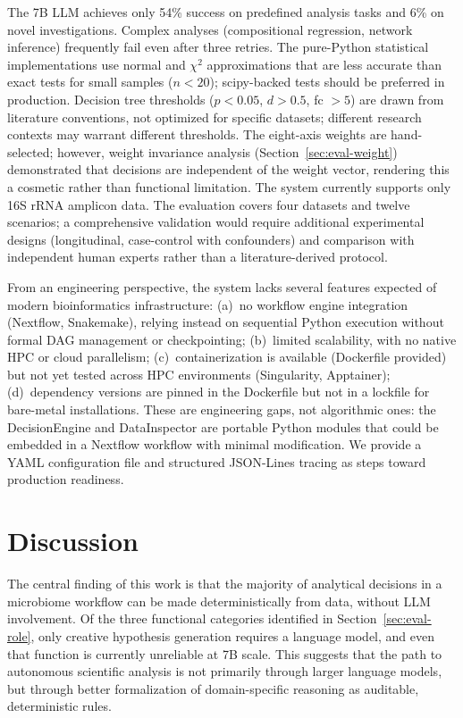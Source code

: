 \documentclass[11pt,a4paper]{article}
\begin{document}
The 7B LLM achieves only 54\% success on predefined analysis tasks
and 6\% on novel investigations.
Complex analyses (compositional regression, network inference)
frequently fail even after three retries.
The pure-Python statistical implementations use normal and $\chi^2$
approximations that are less accurate than exact tests for small
samples ($n < 20$); scipy-backed tests should be preferred in
production.
Decision tree thresholds ($p < 0.05$, $d > 0.5$, fc $> 5$) are
drawn from literature conventions, not optimized for specific
datasets; different research contexts may warrant different
thresholds.
The eight-axis weights are hand-selected; however, weight
invariance analysis (Section~\ref{sec:eval-weight}) demonstrated
that decisions are independent of the weight vector, rendering
this a cosmetic rather than functional limitation.
The system currently supports only 16S rRNA amplicon data.
The evaluation covers four datasets and twelve scenarios; a
comprehensive validation would require additional experimental
designs (longitudinal, case-control with confounders) and
comparison with independent human experts rather than a
literature-derived protocol.

From an engineering perspective, the system lacks several
features expected of modern bioinformatics infrastructure:
(a)~no workflow engine integration (Nextflow, Snakemake), relying
instead on sequential Python execution without formal DAG
management or checkpointing;
(b)~limited scalability, with no native HPC or cloud parallelism;
(c)~containerization is available (Dockerfile provided) but not
yet tested across HPC environments (Singularity, Apptainer);
(d)~dependency versions are pinned in the Dockerfile but not in a
lockfile for bare-metal installations.
These are engineering gaps, not algorithmic ones: the DecisionEngine
and DataInspector are portable Python modules that could be embedded
in a Nextflow workflow with minimal modification.
We provide a YAML configuration file and structured JSON-Lines
tracing as steps toward production readiness.

\section{Discussion}
\label{sec:discussion}

The central finding of this work is that the majority of analytical
decisions in a microbiome workflow can be made deterministically
from data, without LLM involvement.
Of the three functional categories identified in
Section~\ref{sec:eval-role}, only creative hypothesis generation
requires a language model, and even that function is currently
unreliable at 7B scale.
This suggests that the path to autonomous scientific analysis is
not primarily through larger language models, but through better
formalization of domain-specific reasoning as auditable,
deterministic rules.
\end{document}
